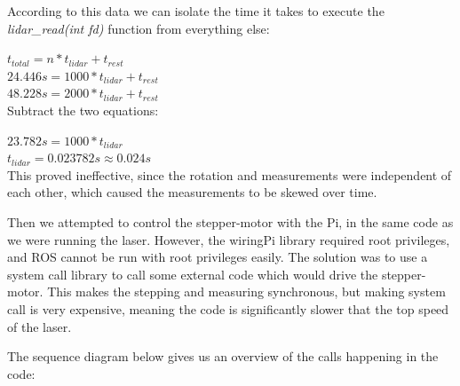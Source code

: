 According to this data we can isolate the time it takes to execute the \textit{lidar\_read(int fd)} function from everything else:

$t_{total} = n*t_{lidar} + t_{rest}$ \\

$24.446s = 1000*t_{lidar} + t_{rest}$ \\
$48.228s = 2000*t_{lidar} + t_{rest}$ \\

Subtract the two equations:

$23.782s = 1000*t_{lidar}$ \\
$t_{lidar} = 0.023782s \approx 0.024s$ \\


This proved ineffective, since the rotation and measurements were independent of each other, which caused the measurements to be skewed over time.

Then we attempted to control the stepper-motor with the Pi, in the same code as we were running the laser. However, the wiringPi library required root privileges, and ROS cannot be run with root privileges easily. The solution was to use a system call library to call some external code which would drive the stepper-motor. This makes the stepping and measuring synchronous, but making system call is very expensive, meaning the code is significantly slower that the top speed of the laser.



The sequence diagram below gives us an overview of the calls happening in the code:

